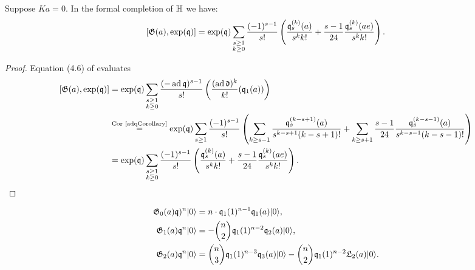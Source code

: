\begin{proposition}
Suppose $Ka=0$.
In the formal completion of $\mathbb{H}$ we have:
$$
\left[ \mathfrak{G}(a),\exp(\mathfrak{q})\right] =
\exp(\mathfrak{q}) \sum_{\substack{s\geq 1\\k\geq 0}}\frac{(-1)^{s-1}}{s!}\left(\frac{\mathfrak{q}_s^{(k)}(a)}{s^{k}k!} + \frac{s-1}{24}\frac{\mathfrak{q}_s^{(k)}(ae)}{s^{k}k!}\right).
$$
\end{proposition}
\begin{proof}
Equation (4.6) of \cite{LehnSorger} evaluates 
\begin{align*}
\left[ \mathfrak{G}(a),\exp(\mathfrak{q})\right] &= \exp(\mathfrak{q}) \sum_{\substack{s\geq 1\\k\geq 0}} \frac{(-\operatorname{ad} \mathfrak{q})^{s-1}}{s!}\left(\frac{(\operatorname{ad} \mathfrak d)^k}{k!} (\mathfrak{q}_1(a)) \right) \\
 &\stackrel{\text{Cor \ref{adqCorollary}}}{=} \exp(\mathfrak{q})  \sum_{s\geq 1}\frac{(-1)^{s-1}}{s!}\left(\sum_{k\geq s-1}\frac{\mathfrak{q}_s^{(k-s+1)}(a)}{s^{k-s+1}(k-s+1)!}
  + \sum_{k\geq s+1}\frac{s-1}{24}\frac{\mathfrak{q}_s^{(k-s-1)}(a)}{s^{k-s-1}(k-s-1)!} \right)\\
  &=\exp(\mathfrak{q}) \sum_{\substack{s\geq 1\\k\geq 0}}\frac{(-1)^{s-1}}{s!}\left(\frac{\mathfrak{q}_s^{(k)}(a)}{s^{k}k!} + \frac{s-1}{24}\frac{\mathfrak{q}_s^{(k)}(ae)}{s^{k}k!}\right).
\end{align*}
\end{proof}
\begin{example} 
\begin{align}
 \mathfrak{G}_0(a)\mathfrak{q})^n|0\rangle & = n\cdot \mathfrak{q}_1(1)^{n-1}\mathfrak{q}_1(a)|0\rangle, \\
 \mathfrak{G}_1(a)\mathfrak{q}^n|0\rangle & = -\binom{n}{2} \mathfrak{q}_1(1)^{n-2}\mathfrak{q}_2(a)|0\rangle, \\
 \mathfrak{G}_2(a)\mathfrak{q}^n|0\rangle & = \binom{n}{3} \mathfrak{q}_1(1)^{n-3}\mathfrak{q}_3(a)|0\rangle - \binom{n}{2} \mathfrak{q}_1(1)^{n-2}\mathfrak{L}_2(a)|0\rangle.
\end{align}
\end{example}

